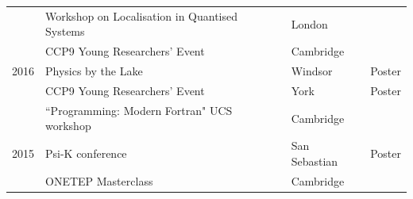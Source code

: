 \documentclass[10pt,a4paper,final]{article}
\begin{document}
\begin{tabularx}{\textwidth}{
      m{}%
      m{}%
      m{}%
      m{}}
                 & Workshop on Localisation in Quantised Systems               & London            &                       \\
                 & CCP9 Young Researchers' Event                               & Cambridge         &                       \\
   {2016}        & Physics by the Lake                                         & Windsor           & Poster                \\
                 & CCP9 Young Researchers' Event                               & York              & Poster                \\
                 & ``Programming: Modern Fortran" UCS workshop                 & Cambridge         &                       \\
   {2015}        & Psi-K conference                                            & San Sebastian     & Poster                \\
                 & ONETEP Masterclass                                          & Cambridge         &
\end{tabularx}
%
\end{document}
